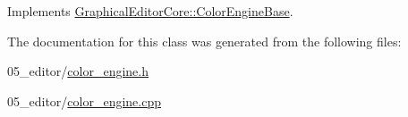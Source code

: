 Implements \hyperlink{classGraphicalEditorCore_1_1ColorEngineBase_a9d0b1a48ea117d8f47c43b9c63982dc5}{Graphical\+Editor\+Core\+::\+Color\+Engine\+Base}.



The documentation for this class was generated from the following files\+:\begin{DoxyCompactItemize}
\item 
05\+\_\+editor/\hyperlink{color__engine_8h}{color\+\_\+engine.\+h}\item 
05\+\_\+editor/\hyperlink{color__engine_8cpp}{color\+\_\+engine.\+cpp}\end{DoxyCompactItemize}
